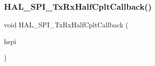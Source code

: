 \subsubsection{\texorpdfstring{H\+A\+L\+\_\+\+S\+P\+I\+\_\+\+Tx\+Rx\+Half\+Cplt\+Callback()}{HAL\_SPI\_TxRxHalfCpltCallback()}}
{\footnotesize\ttfamily void H\+A\+L\+\_\+\+S\+P\+I\+\_\+\+Tx\+Rx\+Half\+Cplt\+Callback (\begin{DoxyParamCaption}\item[{\hyperlink{group___s_p_i___exported___types_gab3bd115785297692c125528b7293566b}{S\+P\+I\+\_\+\+Handle\+Type\+Def} $\ast$}]{hspi }\end{DoxyParamCaption})}

